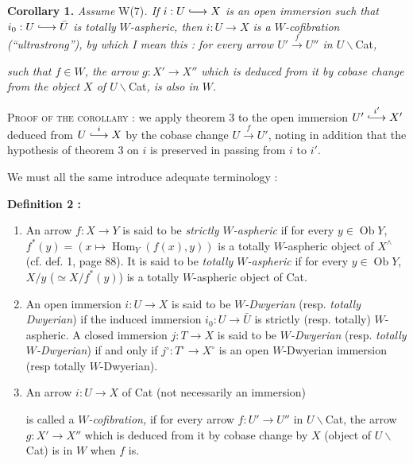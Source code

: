 \documentclass[11pt]{article}
\newcommand{\printedpage}[1]{\marginpar{\footnotesize p.~#1}}
\newcommand{\msp}[1]{\marginpar{\footnotesize [#1]}}
\newcommand{\hra}{\lhook\joinrel\longrightarrow}
\begin{document}
\textbf{Corollary 1.} \textit{Assume} W(7)\textit{. If $i:U\hra X$ is an open immersion such that $i_0:U\hra\bar{U}$ is totally} \textit{$W$-aspheric, then $i:U\longrightarrow X$ is a $W$-cofibration (``ultrastrong''), by which I mean this : for every arrow $U'\xrightarrow{f}U''$ in $U\backslash$}Cat\textit{,}

\msp{page 109}

\textit{such that $f\in W$, the arrow $g:X'\longrightarrow X''$ which is deduced from it by cobase change from the object $X$ of $U\backslash$}Cat\textit{, is also in $W$.}

\textsc{Proof of the corollary} : we apply theorem 3 to the open immersion $U'\overset{i'}{\hra}X'$ deduced from $U\overset{i}{\hra}X$ by the cobase change $U\xrightarrow{f}U'$, noting in addition that the hypothesis of theorem 3 on $i$ is preserved in passing from $i$ to $i'$.

We must all the same introduce adequate terminology :

\textbf{Definition 2 :}

\begin{enumerate}[label=\alph*)]
\item An arrow $f:X\longrightarrow Y$ is said to be \textit{strictly $W$-aspheric} if for every $y\in\operatorname{Ob}Y$, $f^*(y)=(x\longmapsto\operatorname{Hom}_Y(f(x),y))$ is a totally $W$-aspheric object of $X^\wedge$ (cf. def. 1, page 88). It is said to be \textit{totally $W$-aspheric} if for every $y\in\operatorname{Ob}Y$, $X/y$ ($\simeq X/f^*(y)$) is a totally $W$-aspheric object of Cat.

\item \printedpage{76}
An open immersion $i:U\longrightarrow X$ is said to be \textit{$W$-Dwyerian} (resp. \textit{totally} \textit{Dwyerian}) if the induced immersion $i_0:U\longrightarrow\bar{U}$ is strictly (resp. totally) $W$-aspheric. A closed immersion $j:T\longrightarrow X$ is said to be \textit{$W$-Dwyerian} (resp. \textit{totally $W$-Dwyerian}) if and only if $j^\circ:T^\circ\longrightarrow X^\circ$ is an open $W$-Dwyerian immersion (resp totally $W$-Dwyerian).

\item An arrow $i:U\longrightarrow X$ of Cat (not necessarily an immersion)

\msp{page 110}

is called a \textit{$W$-cofibration,} if for every arrow $f:U'\longrightarrow U''$ in $U\backslash$Cat, the arrow $g:X'\longrightarrow X''$ which is deduced from it by cobase change by $X$ (object of $U\backslash$Cat) is in $W$ when $f$ is.
\end{enumerate}
\end{document}
